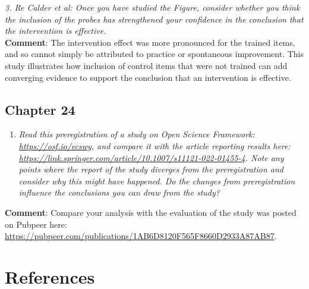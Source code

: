 \documentclass{krantz}
\providecommand{\tightlist}{%
\setlength{\itemsep}{0pt}\setlength{\parskip}{0pt}}
\begin{document}
\emph{3. Re Calder et al: Once you have studied the Figure, consider whether you think the inclusion of the probes has strengthened your confidence in the conclusion that the intervention is effective.}\\
\textbf{Comment}: The intervention effect was more pronounced for the trained items, and so cannot simply be attributed to practice or spontaneous improvement. This study illustrates how inclusion of control items that were not trained can add converging evidence to support the conclusion that an intervention is effective.

\hypertarget{chapter-24}{%
\section{Chapter 24}\label{chapter-24}}

\begin{enumerate}
\def\labelenumi{\arabic{enumi}.}
\tightlist
\item
  \emph{Read this preregistration of a study on Open Science Framework: \url{https://osf.io/ecswy}, and compare it with the article reporting results here: \url{https://link.springer.com/article/10.1007/s11121-022-01455-4}. Note any points where the report of the study diverges from the preregistration and consider why this might have happened. Do the changes from preregistration influence the conclusions you can draw from the study?}
\end{enumerate}

\textbf{Comment}: Compare your analysis with the evaluation of the study was posted on Pubpeer here: \url{https://pubpeer.com/publications/1AB6D8120F565F8660D2933A87AB87}.

\hypertarget{endmatter}{%
\chapter{References}\label{endmatter}}
\end{document}
